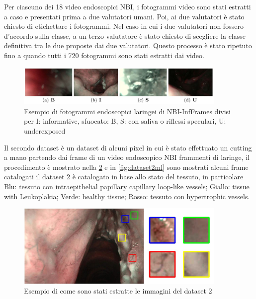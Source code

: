 Per ciascuno dei 18 video endoscopici NBI, i fotogrammi video sono stati estratti a caso e
presentati prima a due valutatori umani. Poi, ai due valutatori è stato chiesto di etichettare i fotogrammi. Nel caso in cui i due
valutatori non fossero d'accordo sulla classe, a un terzo valutatore è stato
chiesto di scegliere la classe definitiva tra le due proposte
dai due valutatori. Questo processo è stato ripetuto fino a quando tutti i
720 fotogrammi sono stati estratti dai video.

\begin{figure}[ht]
    \centering
    \includegraphics[width=0.9\textwidth]{introduzione/Larynge.jpg}
    \caption{Esempio di fotogrammi endoscopici laringei di NBI-InfFrames divisi per I: informative, sfuocato: B, S: con
    saliva o riflessi speculari,
    U: underexposed}
    \label{fig:larynges}
\end{figure}

Il secondo dataset è un dataset di alcuni pixel in cui è stato effettuato un cutting a mano partendo dai frame di  un video endoscopico NBI frammenti di laringe, il procedimento è mostrato nella \cref{fig:dataset2}  e in \cref{fig:dataset2ml} sono mostrati alcuni frame catalogati il dataset 2 è catalogato in base allo stato del tessuto, in particolare Blu: tessuto con intraepithelial papillary capillary loop-like vessels; Giallo: tissue with Leukoplakia;
Verde: healthy tissue; Rosso: tessuto con hypertrophic vessels\cite{moccia_larynge}.

\begin{figure}[ht]
    \centering
    \includegraphics[width=0.9\textwidth]{introduzione/dataset-2.JPG}
    \caption{Esempio di come sono stati estratte le immagini del dataset 2}
    \label{fig:dataset2}
\end{figure}

